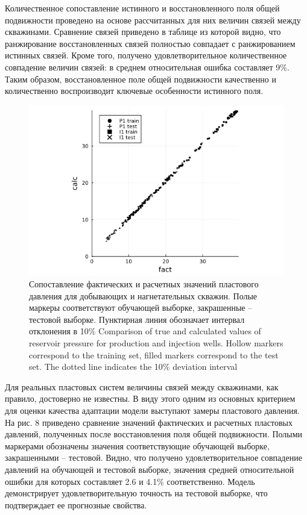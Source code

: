 \documentclass{article}
\begin{document}
Количественное сопоставление истинного и восстановленного поля общей подвижности проведено на основе рассчитанных для них величин связей между скважинами. Сравнение связей приведено в таблице из которой видно, что ранжирование восстановленных связей полностью совпадает с ранжированием истинных связей. Кроме того, получено удовлетворительное количественное совпадение величин связей: в среднем относительная ошибка составляет 9\%. Таким образом, восстановленное поле общей подвижности качественно и количественно воспроизводит ключевые особенности истинного поля.

\begin{figure}
	\centering
	\includegraphics[width=0.7\linewidth]{fig6}
	\caption{Сопоставление фактических и расчетных значений пластового давления для добывающих и нагнетательных скважин. Полые маркеры соответствуют обучающей выборке, закрашенные – тестовой выборке. Пунктирная линия обозначает интервал отклонения в 10\% Comparison of true and calculated values of reservoir pressure for production and injection wells. Hollow markers correspond to the training set, filled markers correspond to the test set. The dotted line indicates the 10\% deviation interval}
	\label{fig:cp}
\end{figure}


Для реальных пластовых систем величины связей между скважинами, как правило, достоверно не известны. В виду этого одним из основных критерием для оценки качества адаптации модели выступают замеры пластового давления. На рис. 8 приведено сравнение значений фактических и расчетных пластовых давлений, полученных после восстановления поля общей подвижности. Полыми маркерами обозначены значения соответствующие обучающей выборке, закрашенными – тестовой. Видно, что получено удовлетворительное совпадение давлений  на обучающей и тестовой выборке, значения средней относительной ошибки для которых составляет 2.6 и 4.1\% соответственно. Модель демонстрирует удовлетворительную точность на тестовой выборке, что подтверждает ее прогнозные свойства.
\end{document}
